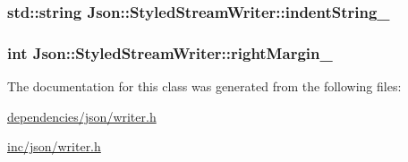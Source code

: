 \hypertarget{classJson_1_1StyledStreamWriter_af9ebd4487e7f69bd1074e6ce29c7cf02}{
\subsubsection[{indent\-String\-\_\-}]{\setlength{\rightskip}{0pt plus 5cm}std\-::string Json\-::\-Styled\-Stream\-Writer\-::indent\-String\-\_\-\hspace{0.3cm}{\ttfamily [private]}}}\label{d8/dc0/classJson_1_1StyledStreamWriter_af9ebd4487e7f69bd1074e6ce29c7cf02}
\hypertarget{classJson_1_1StyledStreamWriter_a67fdaa6758885f082b6a7ede52b0ab91}{
\subsubsection[{right\-Margin\-\_\-}]{\setlength{\rightskip}{0pt plus 5cm}int Json\-::\-Styled\-Stream\-Writer\-::right\-Margin\-\_\-\hspace{0.3cm}{\ttfamily [private]}}}\label{d8/dc0/classJson_1_1StyledStreamWriter_a67fdaa6758885f082b6a7ede52b0ab91}


The documentation for this class was generated from the following files\-:\begin{DoxyCompactItemize}
\item 
\hyperlink{dependencies_2json_2writer_8h}{dependencies/json/writer.\-h}\item 
\hyperlink{inc_2json_2writer_8h}{inc/json/writer.\-h}\end{DoxyCompactItemize}

